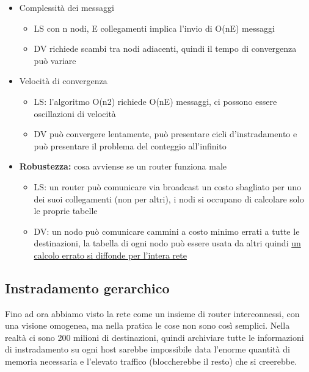 \documentclass{report}
\begin{document}
\begin{itemize}
\item
  Complessità dei messaggi

  \begin{itemize}
  \item
    LS con n nodi, E collegamenti implica l'invio di O(nE) messaggi
  \item
    DV richiede scambi tra nodi adiacenti, quindi il tempo di
    convergenza può variare
  \end{itemize}
\item
  Velocità di convergenza

  \begin{itemize}
  \item
    LS: l'algoritmo O(n2) richiede O(nE) messaggi, ci possono essere
    oscillazioni di velocità
  \item
    DV può convergere lentamente, può presentare cicli d'instradamento e
    può presentare il problema del conteggio all'infinito
  \end{itemize}
\item
  \textbf{Robustezza:} cosa avviense se un router funziona male

  \begin{itemize}
  \item
    LS: un router può comunicare via broadcast un costo sbagliato per
    uno dei suoi collegamenti (non per altri), i nodi si occupano di
    calcolare solo le proprie tabelle
  \item
    DV: un nodo può comunicare cammini a costo minimo errati a tutte le
    destinazioni, la tabella di ogni nodo può essere usata da altri
    quindi \underline{un calcolo errato si diffonde per l'intera rete}
  \end{itemize}
\end{itemize}

\hypertarget{header-n228}{%
\subsection{Instradamento gerarchico}\label{header-n228}}

Fino ad ora abbiamo visto la rete come un insieme di router
interconnessi, con una visione omogenea, ma nella pratica le cose non
sono così semplici. Nella realtà ci sono 200 milioni di destinazioni,
quindi archiviare tutte le informazioni di instradamento su ogni host
sarebbe impossibile data l'enorme quantità di memoria necessaria e
l'elevato traffico (bloccherebbe il resto) che si creerebbe.
\end{document}
